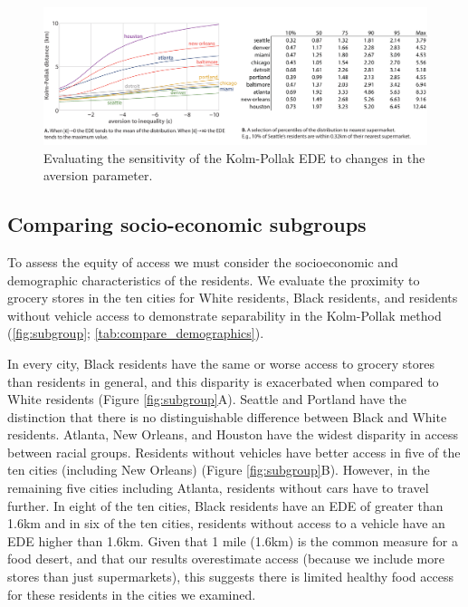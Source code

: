 \documentclass[final,3p,times,onecolumn,sort&compress]{elsarticle}
\begin{document}
\begin{figure}
    \includegraphics[width=\linewidth]{report/fig/fig3.pdf}
    \caption{
    Evaluating the sensitivity of the Kolm-Pollak EDE to changes in the aversion parameter. 
    }
    \label{fig:aversion}
\end{figure}

\subsection{Comparing socio-economic subgroups}
To assess the equity of access we must consider the socioeconomic and demographic characteristics of the residents.
We evaluate the proximity to grocery stores in the ten cities for White residents, Black residents, and residents without vehicle access to demonstrate separability in the Kolm-Pollak method  (\autoref{fig:subgroup}; \autoref{tab:compare_demographics}).

In every city, Black residents have the same or worse access to grocery stores than residents in general, and this disparity is exacerbated when compared to White residents (Figure \ref{fig:subgroup}A).
Seattle and Portland have the distinction that there is no distinguishable difference between Black and White residents. 
Atlanta, New Orleans, and Houston have the widest disparity in access between racial groups.
Residents without vehicles have better access in five of the ten cities (including New Orleans) (Figure \ref{fig:subgroup}B).
However, in the remaining five cities including Atlanta, residents without cars have to travel further.
In eight of the ten cities, Black residents have an EDE of greater than 1.6km and in six of the ten cities, residents without access to a vehicle have an EDE higher than 1.6km. 
Given that 1 mile (1.6km) is the common measure for a food desert, and that our results overestimate access (because we include more stores than just supermarkets), this suggests there is limited healthy food access for these residents in the cities we examined.
\end{document}

